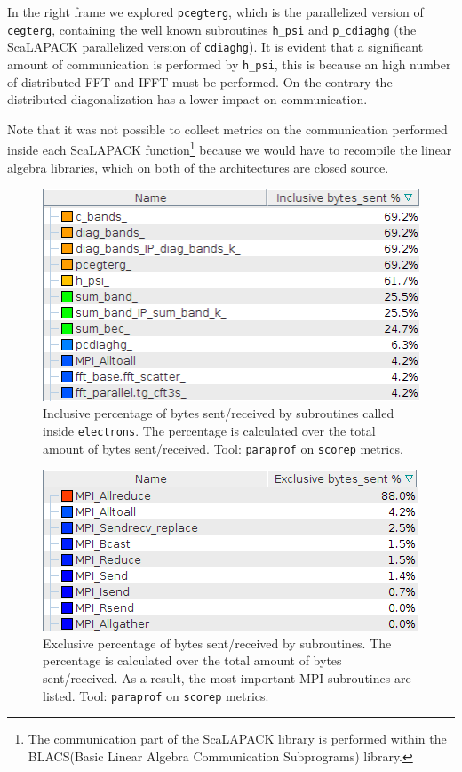 \documentclass[a4paper,12pt]{article}
\begin{document}
In the right frame we explored \texttt{pcegterg}, which is the parallelized version of \texttt{cegterg}, containing the well known subroutines \texttt{h\_psi} and \texttt{p\_cdiaghg} (the ScaLAPACK parallelized version of \texttt{cdiaghg}).
It is evident that a significant amount of communication is performed by \texttt{h\_psi}, this is because an high number of distributed FFT and IFFT must be performed. On the contrary the distributed diagonalization has a lower impact on communication. 

Note that it was not possible to collect metrics on the communication performed inside each ScaLAPACK function\footnote{The communication part of the ScaLAPACK library is performed within the BLACS(Basic Linear Algebra Communication Subprograms) library.} because we would have to recompile the linear algebra libraries, which on both of the architectures are closed source.


\begin{figure}[hhh!]
	\centerline{\includegraphics[scale=0.5]{mpi_inclusive_bytes_sent.png}}
	\caption{ Inclusive percentage of bytes sent/received by subroutines called inside \texttt{electrons}. The percentage is calculated over the total amount of bytes sent/received. Tool: \texttt{paraprof} on \texttt{scorep} metrics.
	}
	\label{fig:MPIinclusive}
\end{figure}

\begin{figure}[hhh!]
	\centerline{\includegraphics[scale=0.5]{mpi_exclusive_bytes_sent.png}}
	\caption{ Exclusive percentage of bytes sent/received by subroutines. 
	The percentage is calculated over the total amount of bytes sent/received. 
	As a result, the most important MPI subroutines are listed.
	Tool: \texttt{paraprof} on \texttt{scorep} metrics.
	}
	\label{fig:MPIexclusive}
\end{figure}
\end{document}
